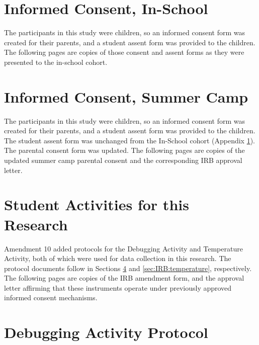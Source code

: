 


\section{Informed Consent, In-School}
\label{sec:icf:school}
The participants in this study were children, so an informed consent form was created for their parents, and a student assent form was provided to the children. The following pages are copies of those consent and assent forms as they were presented to the in-school cohort.




\section{Informed Consent, Summer Camp}
\label{sec:icf:camp}
The participants in this study were children, so an informed consent form was created for their parents, and a student assent form was provided to the children. The student assent form was unchanged from the In-School cohort (Appendix \ref{sec:icf:school}). The parental consent form was updated. The following pages are copies of the updated summer camp parental consent and the corresponding IRB approval letter.





\section{Student Activities for this Research}
Amendment 10 added protocols for the Debugging Activity and Temperature Activity, both of which were used for data collection in this research. The protocol documents follow in Sections \ref{sec:IRB:debugging} and \ref{sec:IRB:temperature}, respectively. The following pages are copies of the IRB amendment form, and the approval letter affirming that these instruments operate under previously approved informed consent mechanisms. 





\section{Debugging Activity Protocol}

\label{sec:IRB:debugging}


